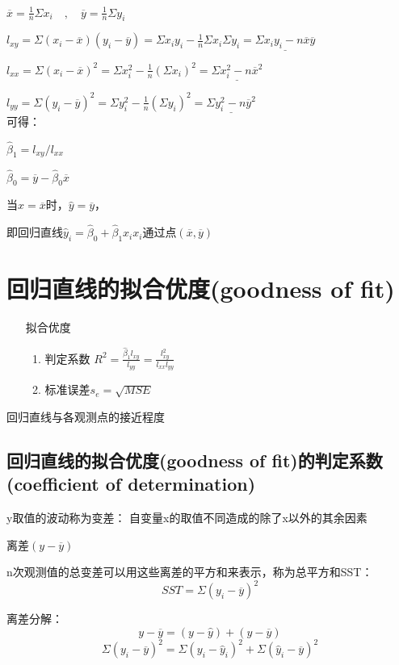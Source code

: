\documentclass[UTF8,10pt]{book}
\begin{document}
{$ \overline{x}=\frac{1}{n}\Sigma x_i \quad , \quad \overline{y}=\frac{1}{n}\Sigma y_i $ 

$ l_{xy} = \Sigma(x_i-\overline{x})(y_i-\overline{y}) = \Sigma x_i y_i - \frac{1}{n}\Sigma x_i \Sigma y_i = \underline{\Sigma x_i y_i - n\overline{x}\overline{y}} $ 


$ l_{xx} = \Sigma (x_i - \overline{x})^2 = \Sigma x_i^2 - \frac{1}{n}(\Sigma x_i)^2 = \underline{\Sigma x_i^2 - n \overline{x}^2} $ 

$ l_{yy} = \Sigma (y_i - \overline{y})^2 = \Sigma y_i^2 - \frac{1}{n}(\Sigma y_i)^2 = \underline{\Sigma y_i^2 - n \overline{y}^2} $ 
\\


可得： 

$ \hat{\beta}_1 = l_{xy} / l_{xx} $

$ \hat{\beta}_0 = \overline{y} - \hat{\beta}_0 \overline{x} $

当$x=\overline{x}$时，$\hat{y}=\overline{y}$，

即回归直线$\hat{y}_i=\hat{\beta}_0+\hat{\beta}_1 x_i x_i$通过点$(\overline{x},\overline{y})$


\section{回归直线的拟合优度(goodness of fit)}	

\begin{itemize}
	\item [拟合优度] {
		\begin{enumerate}
			\item 判定系数 $R^2 = \frac{\hat{\beta}_1 l_{x y }}{l_{y y}} = \frac{l^2_{x y} }{l_{ x x } l_{y y}}$
			\item 标准误差$s_e = \sqrt{MSE} $
		\end{enumerate}
	}
\end{itemize}

回归直线与各观测点的接近程度
\subsection{回归直线的拟合优度(goodness of fit)的判定系数(coefficient of determination)}	
y取值的波动称为变差： 自变量x的取值不同造成的除了x以外的其余因素 

离差$(y-\overline{y})$ 

n次观测值的总变差可以用这些离差的平方和来表示，称为总平方和SST： 
$$SST = \Sigma(y_i - \overline{y})^2$$ 

离差分解： 
$$ y-\overline{y} = (y-\hat{y})+(\hat{y}-\overline{y}) $$ 
$$ \Sigma (y_i-\overline{y})^2 = \Sigma (y_i-\hat{y}_i)^2+\Sigma(\hat{y}_i-\overline{y})^2 $$ 

}
\end{document}
